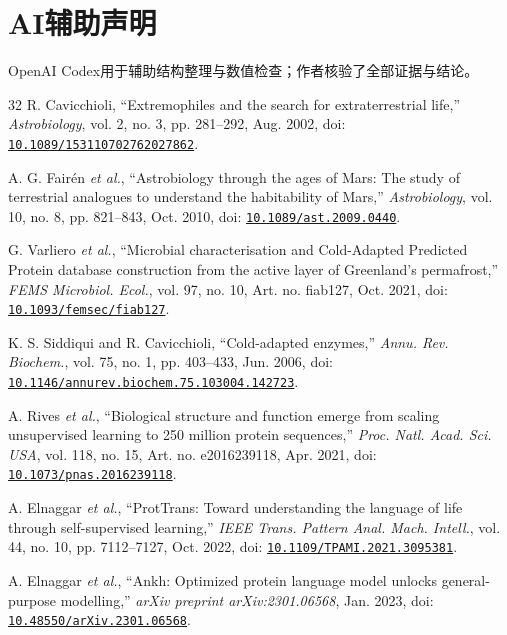 \documentclass[conference]{IEEEtran}
\begin{document}
\section*{AI辅助声明}

OpenAI Codex用于辅助结构整理与数值检查；作者核验了全部证据与结论。

\FloatBarrier

\begin{thebibliography}{32}
 R. Cavicchioli, ``Extremophiles and the search for extraterrestrial life,'' \textit{Astrobiology}, vol. 2, no. 3, pp. 281--292, Aug. 2002, doi: \href{https://doi.org/10.1089/153110702762027862}{\nolinkurl{10.1089/153110702762027862}}.

 A. G. Fair\'en \textit{et al.}, ``Astrobiology through the ages of Mars: The study of terrestrial analogues to understand the habitability of Mars,'' \textit{Astrobiology}, vol. 10, no. 8, pp. 821--843, Oct. 2010, doi: \href{https://doi.org/10.1089/ast.2009.0440}{\nolinkurl{10.1089/ast.2009.0440}}.

 G. Varliero \textit{et al.}, ``Microbial characterisation and Cold-Adapted Predicted Protein database construction from the active layer of Greenland's permafrost,'' \textit{FEMS Microbiol. Ecol.}, vol. 97, no. 10, Art. no. fiab127, Oct. 2021, doi: \href{https://doi.org/10.1093/femsec/fiab127}{\nolinkurl{10.1093/femsec/fiab127}}.

 K. S. Siddiqui and R. Cavicchioli, ``Cold-adapted enzymes,'' \textit{Annu. Rev. Biochem.}, vol. 75, no. 1, pp. 403--433, Jun. 2006, doi: \href{https://doi.org/10.1146/annurev.biochem.75.103004.142723}{\nolinkurl{10.1146/annurev.biochem.75.103004.142723}}.

 A. Rives \textit{et al.}, ``Biological structure and function emerge from scaling unsupervised learning to 250 million protein sequences,'' \textit{Proc. Natl. Acad. Sci. USA}, vol. 118, no. 15, Art. no. e2016239118, Apr. 2021, doi: \href{https://doi.org/10.1073/pnas.2016239118}{\nolinkurl{10.1073/pnas.2016239118}}.

 A. Elnaggar \textit{et al.}, ``ProtTrans: Toward understanding the language of life through self-supervised learning,'' \textit{IEEE Trans. Pattern Anal. Mach. Intell.}, vol. 44, no. 10, pp. 7112--7127, Oct. 2022, doi: \href{https://doi.org/10.1109/TPAMI.2021.3095381}{\nolinkurl{10.1109/TPAMI.2021.3095381}}.

 A. Elnaggar \textit{et al.}, ``Ankh: Optimized protein language model unlocks general-purpose modelling,'' \textit{arXiv preprint arXiv:2301.06568}, Jan. 2023, doi: \href{https://doi.org/10.48550/arXiv.2301.06568}{\nolinkurl{10.48550/arXiv.2301.06568}}.


\end{thebibliography}
\end{document}
